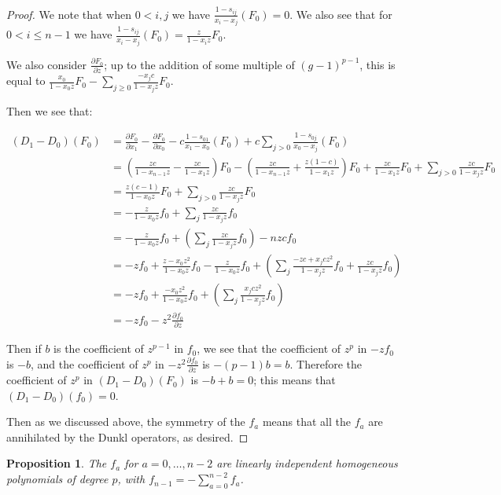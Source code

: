 \documentclass{article}
\numberwithin{equation}{section}
\newtheorem{proposition}[equation]{Proposition}
\begin{document}
\begin{proof}
We note that when $0 < i,j$ we have $\frac{1-s_{ij}}{x_i-x_j}\left(F_0\right)=0$. We also see that for $0 < i \le n-1$ we have $\frac{1-s_{ij}}{x_i-x_j}\left(F_0\right)=\frac{z}{1-x_iz}F_0$. 

We also consider $\frac{\partial F_0}{\partial z}$; up to the addition of some multiple of $(g-1)^{p-1}$, this is equal to $\frac{x_0}{1-x_0z}F_0-\sum_{j \ge 0} \frac{-x_jc}{1-x_jz}F_0$. 

Then we see that:

\begin{align*}
(D_1-D_0)(F_0)&=\frac{\partial F_0}{\partial x_1}-\frac{\partial F_0}{\partial x_0}-c\frac{1-s_{01}}{x_1-x_0}(F_0)+c\sum_{j>0}\frac{1-s_{0j}}{x_0-x_j}(F_0)\\
&=\left(\frac{zc}{1-x_{n-1}z}-\frac{zc}{1-x_1z}\right)F_0-\left(\frac{zc}{1-x_{n-1}z}+\frac{z(1-c)}{1-x_1z}\right)F_0+\frac{zc}{1-x_1z}F_0+\sum_{j>0}\frac{zc}{1-x_jz}F_0\\
&=\frac{z(c-1)}{1-x_0z}F_0+\sum_{j>0}\frac{zc}{1-x_jz}F_0\\
&=-\frac{z}{1-x_0z}f_0+\sum_{j} \frac{zc}{1-x_jz}f_0\\
&=-\frac{z}{1-x_0z}f_0+\left(\sum_{j} \frac{zc}{1-x_jz}f_0\right)-nzcf_0\\
&=-zf_0+\frac{z-x_0z^2}{1-x_0z}f_0-\frac{z}{1-x_0z}f_0+\left(\sum_{j} \frac{-zc+x_jcz^2}{1-x_jz}f_0+\frac{zc}{1-x_jz}f_0\right)\\
&=-zf_0+\frac{-x_0z^2}{1-x_0z}f_0+\left(\sum_{j} \frac{x_jcz^2}{1-x_jz}f_0\right)\\
&=-zf_0-z^2\frac{\partial f_0}{\partial z}
\end{align*}

Then if $b$ is the coefficient of $z^{p-1}$ in $f_0$, we see that the coefficient of $z^p$ in $-zf_0$ is $-b$, and the coefficient of $z^p$ in $-z^2\frac{\partial f_0}{\partial z}$ is $-(p-1)b=b$. Therefore the coefficient of $z^p$ in $(D_1-D_0)(F_0)$ is $-b+b=0$; this means that $(D_1-D_0)(f_0)=0$. 

Then as we discussed above, the symmetry of the $f_a$ means that all the $f_a$ are annihilated by the Dunkl operators, as desired.

\end{proof}

\begin{proposition} The $f_a$ for $a=0,\dots,n-2$ are linearly independent homogeneous polynomials of degree $p$, with $f_{n-1}=-\sum_{a=0}^{n-2} f_a$. 
\end{proposition} 
\end{document}
